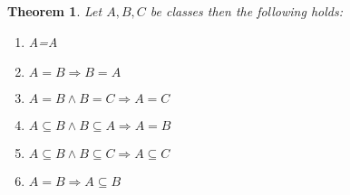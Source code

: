 \documentclass{book}
\newtheorem{theorem}{Theorem}
\begin{document}
\begin{theorem}
  \label{class properties (1)}Let $A, B, C$ be classes then the following
  holds:
  \begin{enumerate}
    \item A=A
    
    \item $A = B \Rightarrow B = A$
    
    \item $A = B \wedge B = C \Rightarrow A = C$
    
    \item $A \subseteq B \wedge B \subseteq A \Rightarrow A = B$
    
    \item $A \subseteq B \wedge B \subseteq C \Rightarrow A \subseteq C$
    
    \item $A = B \Rightarrow A \subseteq B$
  \end{enumerate}
\end{theorem}
\end{document}
